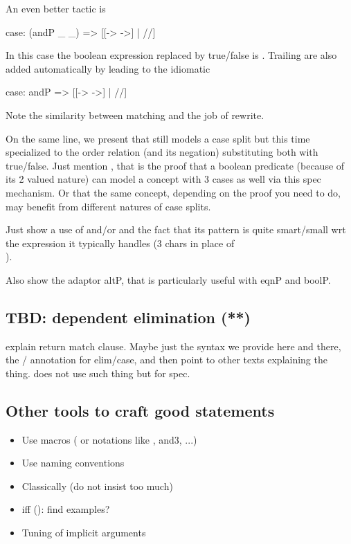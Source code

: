 An even better tactic is

\begin{coq}{}{}
case: (andP _ _) => [[-> ->] | //]
\end{coq}

In this case the boolean expression replaced by true/false is \C{(_ && _)}.
Trailing \C{_} are also added automatically by  leading to the
idiomatic

\begin{coq}{}{}
case: andP => [[-> ->] | //]
\end{coq}

Note the similarity between matching \C{(_ && _)} and the job of rewrite.

On the same line, we present  that still models a case split but
this time specialized to the order relation (and its negation) substituting
both with true/false.  Just mention , that is the proof that
a boolean predicate (because of its 2 valued nature) can model a concept
with 3 cases as well via this spec mechanism.  Or that the same concept,
depending on the proof you need to do, may benefit from different natures
of case splits.


Just show a use of  and/or  and the fact that its pattern is
quite smart/small wrt the expression it typically handles (3 chars in place of\\
).

Also show the adaptor altP, that is particularly useful with eqnP and boolP.

\subsection{TBD: dependent elimination (**)}

explain return match clause.  Maybe just the syntax we provide here and
there, the / annotation for elim/case, and then point to other texts explaining
the thing.  \mcbMC{} does not use such thing but for spec.

\subsection{Other tools to craft good statements}

\begin{itemize}
\item Use macros ( or notations like
, and3, ...)
\item Use naming conventions
\item Classically (do not insist too much)
\item iff (): find examples?
\item Tuning of implicit arguments
\end{itemize}

